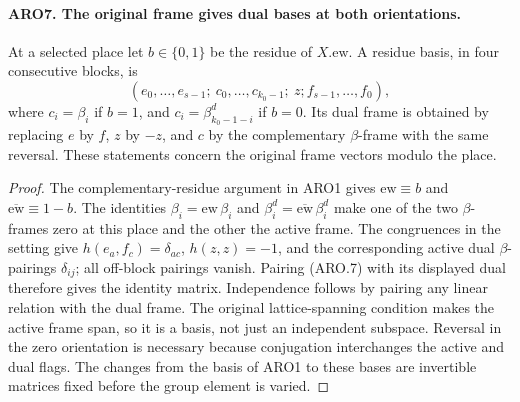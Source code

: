 \paragraph{ARO7. The original frame gives dual bases at both orientations.}
\label{claim:ARO7}
At a selected place let \(b\in\{0,1\}\) be the residue of
\(X.\mathrm{ew}\).  A residue basis, in four consecutive blocks,
is
\[
 (e_0,\ldots,e_{s-1};\ c_0,\ldots,c_{k_0-1};\ z;
                         f_{s-1},\ldots,f_0),        \tag{ARO.7}
\]
where \(c_i=\beta_i\) if \(b=1\), and
\(c_i=\beta^d_{k_0-1-i}\) if \(b=0\).
Its dual frame is obtained by replacing \(e\) by \(f\),
\(z\) by \(-z\), and \(c\) by the complementary \(\beta\)-frame
with the same reversal.  These statements concern the original
frame vectors modulo the place.
\begin{proof}
The complementary-residue argument in ARO1 gives
\(\mathrm{ew}\equiv b\) and \(\overline{\mathrm{ew}}\equiv1-b\).
The identities \(\beta_i=\mathrm{ew}\,\beta_i\) and
\(\beta_i^d=\overline{\mathrm{ew}}\,\beta_i^d\) make one of the
two \(\beta\)-frames zero at this place and the other the active
frame.  The congruences in the setting give
\(h(e_a,f_c)=\delta_{ac}\), \(h(z,z)=-1\), and the corresponding
active dual \(\beta\)-pairings \(\delta_{ij}\); all off-block
pairings vanish.  Pairing (ARO.7) with its displayed dual therefore
gives the identity matrix.  Independence follows by pairing any
linear relation with the dual frame.  The original lattice-spanning
condition makes the active frame span, so it is a basis, not just an
independent subspace.  Reversal in the zero orientation is necessary
because conjugation interchanges the active and dual flags.
The changes from the basis of ARO1 to these bases are invertible
matrices fixed before the group element is varied.
\end{proof}


